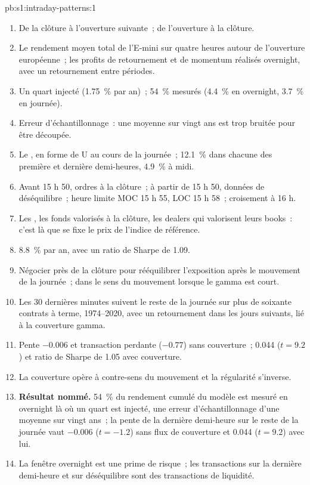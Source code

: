 \begin{solution}{pb:s1:intraday-patterns:1}
\begin{enumerate}
\item De la clôture à l'ouverture suivante~; de l'ouverture à la clôture.
\item Le rendement moyen total de l'E-mini sur quatre heures autour de l'ouverture européenne~; les profits de retournement et de momentum réalisés overnight, avec un retournement entre périodes.
\item Un quart injecté (1.75~\% par an)~; 54~\% mesurés (4.4~\% en overnight, 3.7~\% en journée).
\item Erreur d'échantillonnage~: une moyenne sur vingt ans est trop bruitée pour être découpée.
\item Le , en forme de U au cours de la journée~; 12.1~\% dans chacune des première et dernière demi-heures, 4.9~\% à midi.
\item Avant 15 h 50, ordres à la clôture~; à partir de 15 h 50, données de déséquilibre~; heure limite MOC 15 h 55, LOC 15 h 58~; croisement à 16 h.
\item Les , les fonds valorisés à la clôture, les dealers qui valorisent leurs books~: c'est là que se fixe le prix de l'indice de référence.
\item 8.8~\% par an, avec un ratio de Sharpe de 1.09.
\item Négocier près de la clôture pour rééquilibrer l'exposition après le mouvement de la journée~; dans le sens du mouvement lorsque le gamma est court.
\item Les 30 dernières minutes suivent le reste de la journée sur plus de soixante contrats à terme, 1974--2020, avec un retournement dans les jours suivants, lié à la couverture gamma.
\item Pente $-0.006$ et transaction perdante ($-0.77$) sans couverture~; 0.044 ($t = 9.2$) et ratio de Sharpe de 1.05 avec couverture.
\item La couverture opère à contre-sens du mouvement et la régularité s'inverse.
\item \textbf{Résultat nommé.} 54~\% du rendement cumulé du modèle est mesuré en overnight là où un quart est injecté, une erreur d'échantillonnage d'une moyenne sur vingt ans~;
la pente de la dernière demi-heure sur le reste de la journée vaut $-0.006$ ($t = -1.2$) sans flux de couverture et 0.044 ($t = 9.2$) avec lui.
\item La fenêtre overnight est une prime de risque~; les transactions sur la dernière demi-heure et sur déséquilibre sont des transactions de liquidité.

\end{enumerate}
\end{solution}
